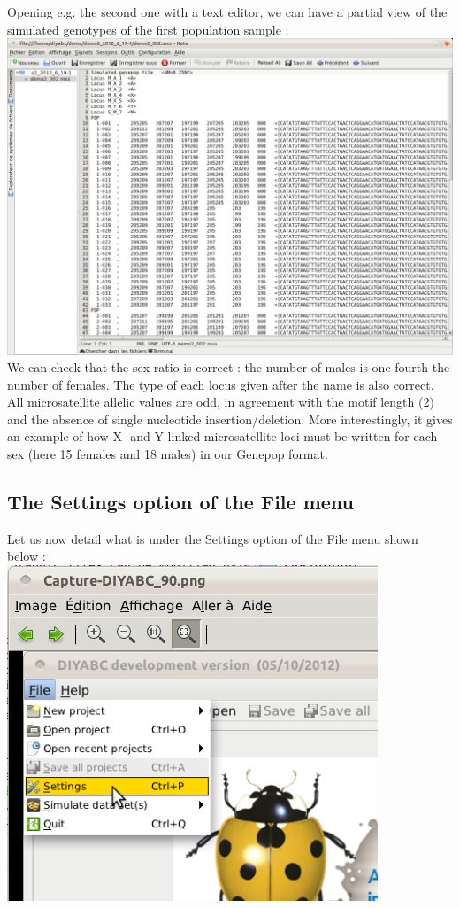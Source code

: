 Opening e.g. the second one with a text editor, we can have a partial view of the simulated genotypes of the first population sample : \\

\includegraphics[scale=0.33]{gui_pictures/Capture-DIYABC-88.png} \\

We can check that the sex ratio is correct : the number of males is one fourth the number of females. The type of each locus given after the name is also correct. All microsatellite allelic values are odd, in agreement with the motif length (2) and the absence of single nucleotide insertion/deletion. More interestingly, it gives an example of how X- and Y-linked microsatellite loci must be written for each sex (here 15 females and 18 males) in our Genepop format. 


\subsection{The \textsf{Settings} option of the \textsf{File} menu}

Let us now detail what is under the \textsf{Settings} option of the \textsf{File} menu shown below :\\

\includegraphics[scale=0.33]{gui_pictures/Capture-DIYABC-91.png} \\

